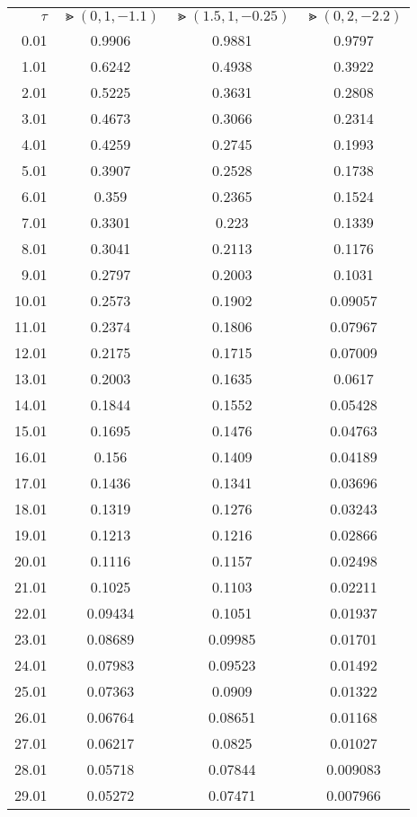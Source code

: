 \begin{table}[H]
	\begin{center}
		\begin{tabular}{r | c | c | c} 
		 	$ \tau $ & $ \Gt(0, 1, -1.1) $ & $ \Gt(1.5, 1, -0.25) $ & $ \Gt(0, 2, -2.2) $ \\ 
		 	\specialrule{.1em}{.05em}{.05em} 
0.01 & 0.9906 & 0.9881 & 0.9797 \\
1.01 & 0.6242 & 0.4938 & 0.3922 \\
2.01 & 0.5225 & 0.3631 & 0.2808 \\
3.01 & 0.4673 & 0.3066 & 0.2314 \\
4.01 & 0.4259 & 0.2745 & 0.1993 \\
5.01 & 0.3907 & 0.2528 & 0.1738 \\
6.01 & 0.359 & 0.2365 & 0.1524 \\
7.01 & 0.3301 & 0.223 & 0.1339 \\
8.01 & 0.3041 & 0.2113 & 0.1176 \\
9.01 & 0.2797 & 0.2003 & 0.1031 \\
10.01 & 0.2573 & 0.1902 & 0.09057 \\
11.01 & 0.2374 & 0.1806 & 0.07967 \\
12.01 & 0.2175 & 0.1715 & 0.07009 \\
13.01 & 0.2003 & 0.1635 & 0.0617 \\
14.01 & 0.1844 & 0.1552 & 0.05428 \\
15.01 & 0.1695 & 0.1476 & 0.04763 \\
16.01 & 0.156 & 0.1409 & 0.04189 \\
17.01 & 0.1436 & 0.1341 & 0.03696 \\
18.01 & 0.1319 & 0.1276 & 0.03243 \\
19.01 & 0.1213 & 0.1216 & 0.02866 \\
20.01 & 0.1116 & 0.1157 & 0.02498 \\
21.01 & 0.1025 & 0.1103 & 0.02211 \\
22.01 & 0.09434 & 0.1051 & 0.01937 \\
23.01 & 0.08689 & 0.09985 & 0.01701 \\
24.01 & 0.07983 & 0.09523 & 0.01492 \\
25.01 & 0.07363 & 0.0909 & 0.01322 \\
26.01 & 0.06764 & 0.08651 & 0.01168 \\
27.01 & 0.06217 & 0.0825 & 0.01027 \\
28.01 & 0.05718 & 0.07844 & 0.009083 \\
29.01 & 0.05272 & 0.07471 & 0.007966 \\

\end{tabular}
\end{center}
\end{table}
